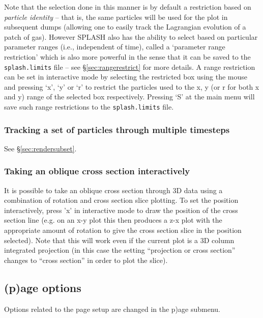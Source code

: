 \documentclass[a4paper,10pt]{article}
\newcommand{\splash}{\textsc{SPLASH }}
\begin{document}
 Note that the selection done in this manner is by default a restriction based on \emph{particle identity} -- that is, the same particles will be used for the plot in subsequent dumps (allowing one to easily track the Lagrangian evolution of a patch of gas). However \splash also has the ability to select based on particular parameter ranges (i.e., independent of time), called a `parameter range restriction' which is also more powerful in the sense that it can be saved to the \verb+splash.limits+ file -- see \S\ref{sec:rangerestrict} for more details. A range restriction can be set in interactive mode by selecting the restricted box using the mouse and pressing `x', `y' or `r' to restrict the particles used to the x, y (or r for both x and y) range of the selected box respectively. Pressing `S' at the main menu will save such range restrictions to the \verb+splash.limits+ file.

\subsubsection{ Tracking a set of particles through multiple timesteps}
 See \S\ref{sec:rendersubset}.

\subsubsection{ Taking an oblique cross section interactively}
 \label{sec:obliquexsec}
 It is possible to take an oblique cross section through 3D data using a combination of rotation and cross section slice plotting. To set the position interactively, press 'x' in interactive mode to draw the position of the cross section line (e.g. on an x-y plot this then produces a z-x plot with the appropriate amount of rotation to give the cross section slice in the position selected). Note that this will work even if the current plot is a 3D column integrated projection (in this case the setting ``projection or cross section'' changes to ``cross section'' in order to plot the slice). 

\subsection{(p)age options}
\label{sec:optionspage}
 Options related to the page setup are changed in the p)age submenu.
\end{document}
